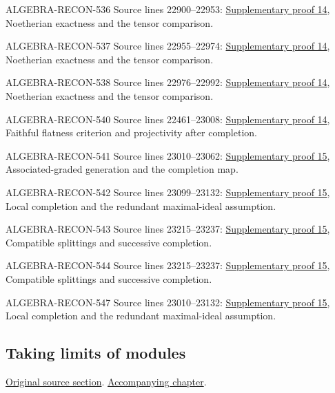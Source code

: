 \begin{AlgebraSourceRoutes}
\item[ALGEBRA-RECON-536] Source lines 22900--22953: \hyperlink{algebra_projectivity_completion_notes_20260927}{Supplementary proof 14}, Noetherian exactness and the tensor comparison.
\item[ALGEBRA-RECON-537] Source lines 22955--22974: \hyperlink{algebra_projectivity_completion_notes_20260927}{Supplementary proof 14}, Noetherian exactness and the tensor comparison.
\item[ALGEBRA-RECON-538] Source lines 22976--22992: \hyperlink{algebra_projectivity_completion_notes_20260927}{Supplementary proof 14}, Noetherian exactness and the tensor comparison.
\item[ALGEBRA-RECON-540] Source lines 22461--23008: \hyperlink{algebra_projectivity_completion_notes_20260927}{Supplementary proof 14}, Faithful flatness criterion and projectivity after completion.
\item[ALGEBRA-RECON-541] Source lines 23010--23062: \hyperlink{algebra_graded_completion_notes_20260927}{Supplementary proof 15}, Associated-graded generation and the completion map.
\item[ALGEBRA-RECON-542] Source lines 23099--23132: \hyperlink{algebra_graded_completion_notes_20260927}{Supplementary proof 15}, Local completion and the redundant maximal-ideal assumption.
\item[ALGEBRA-RECON-543] Source lines 23215--23237: \hyperlink{algebra_graded_completion_notes_20260927}{Supplementary proof 15}, Compatible splittings and successive completion.
\item[ALGEBRA-RECON-544] Source lines 23215--23237: \hyperlink{algebra_graded_completion_notes_20260927}{Supplementary proof 15}, Compatible splittings and successive completion.
\item[ALGEBRA-RECON-547] Source lines 23010--23132: \hyperlink{algebra_graded_completion_notes_20260927}{Supplementary proof 15}, Local completion and the redundant maximal-ideal assumption.
\end{AlgebraSourceRoutes}

\subsection{Taking limits of modules}
\hypertarget{algebra-source-section-limits}{}
\noindent\href{https://github.com/stacks/stacks-project/blob/a04446e57ec1fbc252a871afcec7752fb2807b14/algebra.tex\#L23247}{Original source section}. \href{algebra.pdf\#nameddest=section-limits}{Accompanying chapter}.

